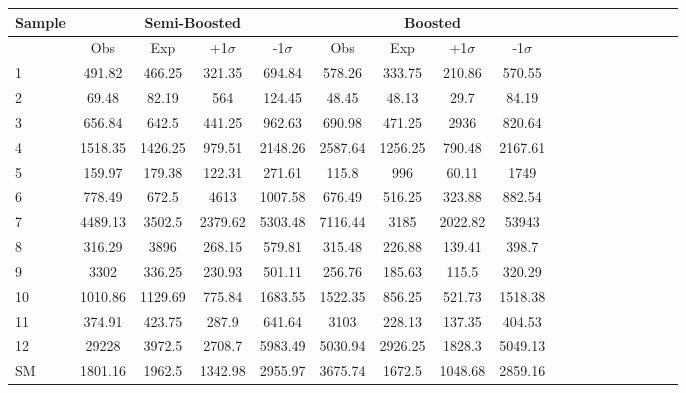 \begin{table}[h]
\label{tab:2p1lim}
\begin{tabular}{|l|c|c|c|c|c|c|c|c|c|c|c|c|c|c|c|c|c|}
\hline
Sample & \multicolumn{4}{c}{Semi-Boosted} & \multicolumn{4}{c}{Boosted}  \\  \hline \hline
& Obs & Exp & +1$\sigma$ &-1$\sigma$  & Obs &Exp & +1$\sigma$ &-1$\sigma$ \\ \hline
1 & 491.82 & 466.25 & 321.35 & 694.84 & 578.26 & 333.75 & 210.86 & 570.55\\
2 & 69.48 & 82.19 & 564 & 124.45& 48.45 & 48.13 & 29.7 & 84.19\\
3 & 656.84 & 642.5 & 441.25 & 962.63 & 690.98 & 471.25 & 2936 & 820.64\\
4 & 1518.35 & 1426.25 & 979.51 & 2148.26 & 2587.64 & 1256.25 & 790.48 & 2167.61\\
5 & 159.97 & 179.38 & 122.31 & 271.61 & 115.8 & 996 & 60.11 & 1749\\
6 & 778.49 & 672.5 & 4613 & 1007.58 & 676.49 & 516.25 & 323.88 & 882.54\\
7 & 4489.13 & 3502.5 & 2379.62 & 5303.48 & 7116.44 & 3185 & 2022.82 & 53943 \\
8 & 316.29 & 3896 & 268.15 & 579.81 & 315.48 & 226.88 & 139.41 & 398.7 \\
9 & 3302 & 336.25 & 230.93 & 501.11 & 256.76 & 185.63 & 115.5 & 320.29 \\
10 & 1010.86 & 1129.69 & 775.84 & 1683.55 & 1522.35 & 856.25 & 521.73 & 1518.38 \\
11 & 374.91 & 423.75 & 287.9 & 641.64 & 3103 & 228.13 & 137.35 & 404.53 \\
12 & 29228 & 3972.5 & 2708.7 & 5983.49 & 5030.94 & 2926.25 & 1828.3 & 5049.13\\
SM & 1801.16 & 1962.5 & 1342.98 & 2955.97 & 3675.74 & 1672.5 & 1048.68 & 2859.16 \\
\hline
\end{tabular}
\end{table} 


